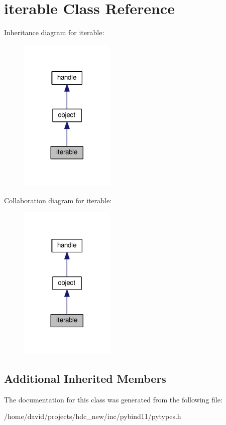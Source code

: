 \hypertarget{classiterable}{}\section{iterable Class Reference}
\label{classiterable}


Inheritance diagram for iterable\+:
\nopagebreak
\begin{figure}[H]
\begin{center}
\leavevmode
\includegraphics[width=128pt]{classiterable__inherit__graph}
\end{center}
\end{figure}


Collaboration diagram for iterable\+:
\nopagebreak
\begin{figure}[H]
\begin{center}
\leavevmode
\includegraphics[width=128pt]{classiterable__coll__graph}
\end{center}
\end{figure}
\subsection*{Additional Inherited Members}


The documentation for this class was generated from the following file\+:\begin{DoxyCompactItemize}
\item 
/home/david/projects/hdc\+\_\+new/inc/pybind11/pytypes.\+h\end{DoxyCompactItemize}
